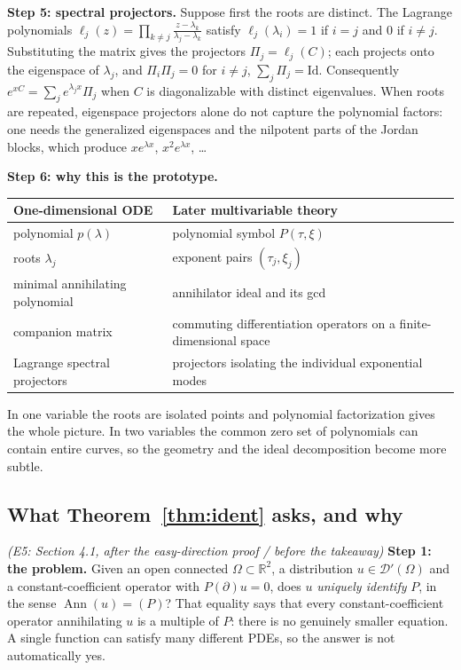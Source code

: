 \documentclass[11pt]{article}
\theoremstyle{plain}
\theoremstyle{definition}
\theoremstyle{remark}
\newcommand{\R}{\mathbb{R}}
\DeclareMathOperator{\Ann}{Ann}             %
\newcommand{\Id}{\mathrm{Id}}
\begin{document}
\medskip\textbf{Step 5: spectral projectors.} Suppose first the roots are distinct. The Lagrange polynomials $\ell_j(z)=\prod_{k\ne j}\frac{z-\lambda_k}{\lambda_j-\lambda_k}$ satisfy $\ell_j(\lambda_i)=1$ if $i=j$ and $0$ if $i\ne j$. Substituting the matrix gives the projectors $\Pi_j=\ell_j(C)$; each projects onto the eigenspace of $\lambda_j$, and $\Pi_i\Pi_j=0$ for $i\ne j$, $\sum_j\Pi_j=\Id$. Consequently $e^{xC}=\sum_je^{\lambda_jx}\Pi_j$ when $C$ is diagonalizable with distinct eigenvalues. When roots are repeated, eigenspace projectors alone do not capture the polynomial factors: one needs the generalized eigenspaces and the nilpotent parts of the Jordan blocks, which produce $xe^{\lambda x}$, $x^2e^{\lambda x}$, \dots

\medskip\textbf{Step 6: why this is the prototype.}
\begin{center}\small
\begin{tabular}{@{}L{5.6cm}L{8.6cm}@{}}
\toprule
One-dimensional ODE & Later multivariable theory\\\midrule
polynomial $p(\lambda)$ & polynomial symbol $P(\tau,\xi)$\\
roots $\lambda_j$ & exponent pairs $(\tau_j,\xi_j)$\\
minimal annihilating polynomial & annihilator ideal and its gcd\\
companion matrix & commuting differentiation operators on a finite-dimensional space\\
Lagrange spectral projectors & projectors isolating the individual exponential modes\\
\bottomrule
\end{tabular}
\end{center}
In one variable the roots are isolated points and polynomial factorization gives the whole picture. In two variables the common zero set of polynomials can contain entire curves, so the geometry and the ideal decomposition become more subtle.

\subsection{What Theorem~\ref{thm:ident} asks, and why}\label{expl:E5}
\noindent\emph{(E5: Section 4.1, after the easy-direction proof / before the takeaway)}
\textbf{Step 1: the problem.} Given an open connected $\Omega\subset\R^2$, a distribution $u\in\mathcal D'(\Omega)$ and a constant-coefficient operator with $P(\partial)u=0$, does $u$ \emph{uniquely identify} $P$, in the sense $\Ann(u)=(P)$? That equality says that every constant-coefficient operator annihilating $u$ is a multiple of $P$: there is no genuinely smaller equation. A single function can satisfy many different PDEs, so the answer is not automatically yes.
\end{document}
